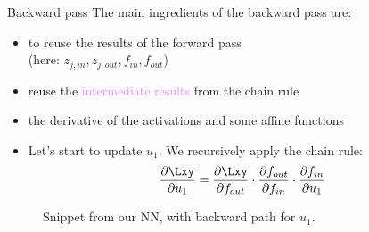 \begin{vbframe}{Backward pass}
   The main ingredients of the backward pass are: 
    \begin{itemize}
      \item to reuse the results of the forward pass \\ (here:  ${z_{j, in}, z_{j, out}, f_{in},f_{out}}$)
      \item reuse the \textcolor{violet}{intermediate results} from the chain rule 
      \item the derivative of the activations and some affine functions
    \end{itemize}
\framebreak

  \begin{itemize}
    \item Let's start to update $u_1$. We recursively apply the chain rule: $$\frac{\partial \Lxy}{\partial u_1} = \frac{\partial \Lxy}{\partial f_{out}} \cdot \frac{\partial f_{out}}{\partial f_{in}} \cdot \frac{\partial f_{in}}{\partial u_1}$$
  \end{itemize}
  \begin{figure}
    \centering
      \caption{\footnotesize{Snippet from our NN, with backward path for $u_1$.}}
  \end{figure}
\framebreak


\end{vbframe}
